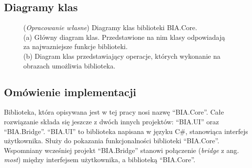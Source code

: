 \documentclass{article}
\begin{document}
        \subsection{Diagramy klas}
        \begin{figure}[H]
            \centering
            \qquad
            \caption
            {
                (\textit{Opracowanie własne}) Diagramy klas biblioteki BIA.Core.\\
                (a) Główny diagram klas. Przedstawione na nim klasy odpowiadają za najwazniejsze funkcje biblioteki.\\
                (b) Diagram klas przedstawiający operacje, których wykonanie na obrazach umożliwia biblioteka.
            }
            \label{class_diagram}
        \end{figure}
        \subsection{Omówienie implementacji}
        {
            \label{omowienieimplementacji}
            \Large
            \justifying
            \quad
            Biblioteka, która opisywana jest w tej pracy nosi nazwę ``BIA.Core''.
            Całe rozwiązanie składa się jeszcze z dwóch innych projektów: ``BIA.UI'' oraz ``BIA.Bridge''.
            ``BIA.UI'' to biblioteka napisana w języku C\#, stanowiąca interfejs użytkownika. Służy do pokazania funkcjonalności biblioteki ``BIA.Core''.
            Wspomniany wcześniej projekt ``BIA.Bridge'' stanowi połączenie (\emph{bridge} z ang. \emph{most}) między interfejsem użytkownika, a biblioteką ``BIA.Core''.
        }
\end{document}
